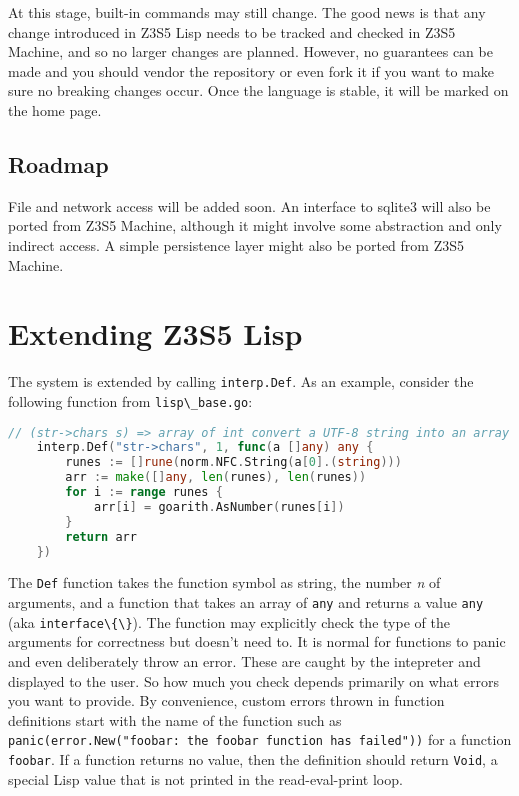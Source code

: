 \documentclass[
]{article}
\newcommand{\passthrough}[1]{#1}
\begin{document}
At this stage, built-in commands may still change. The good news is that
any change introduced in Z3S5 Lisp needs to be tracked and checked in
Z3S5 Machine, and so no larger changes are planned. However, no
guarantees can be made and you should vendor the repository or even fork
it if you want to make sure no breaking changes occur. Once the language
is stable, it will be marked on the home page.

\hypertarget{roadmap}{%
\subsection{Roadmap}\label{roadmap}}

File and network access will be added soon. An interface to sqlite3 will
also be ported from Z3S5 Machine, although it might involve some
abstraction and only indirect access. A simple persistence layer might
also be ported from Z3S5 Machine.

\hypertarget{extending-z3s5-lisp}{%
\section{Extending Z3S5 Lisp}\label{extending-z3s5-lisp}}

The system is extended by calling \passthrough{\lstinline!interp.Def!}.
As an example, consider the following function from
\passthrough{\lstinline!lisp\_base.go!}:

\begin{lstlisting}[language=Go]
    // (str->chars s) => array of int convert a UTF-8 string into an array of runes
    interp.Def("str->chars", 1, func(a []any) any {
        runes := []rune(norm.NFC.String(a[0].(string)))
        arr := make([]any, len(runes), len(runes))
        for i := range runes {
            arr[i] = goarith.AsNumber(runes[i])
        }
        return arr
    })
\end{lstlisting}

The \passthrough{\lstinline!Def!} function takes the function symbol as
string, the number \emph{n} of arguments, and a function that takes an
array of \passthrough{\lstinline!any!} and returns a value
\passthrough{\lstinline!any!} (aka
\passthrough{\lstinline!interface\{\}!}). The function may explicitly
check the type of the arguments for correctness but doesn't need to. It
is normal for functions to panic and even deliberately throw an error.
These are caught by the intepreter and displayed to the user. So how
much you check depends primarily on what errors you want to provide. By
convenience, custom errors thrown in function definitions start with the
name of the function such as
\passthrough{\lstinline!panic(error.New("foobar: the foobar function has failed"))!}
for a function \passthrough{\lstinline!foobar!}. If a function returns
no value, then the definition should return
\passthrough{\lstinline!Void!}, a special Lisp value that is not printed
in the read-eval-print loop.
\end{document}
